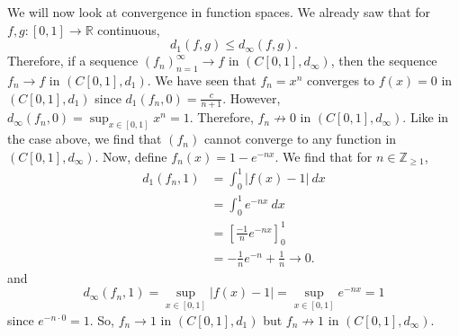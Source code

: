 \documentclass[a4paper, openany]{memoir}
\theoremstyle{definition}
\theoremstyle{plain}
\begin{document}
We will now look at convergence in function spaces. We already saw that for $f, g: [0, 1] \to \mathbb{R}$ continuous,
\[d_1(f, g) \leqslant d_\infty(f, g).\]
Therefore, if a sequence $(f_n)_{n=1}^{\infty} \to f$ in $(C[0, 1], d_\infty)$, then the sequence $f_n \to f$ in $(C[0, 1], d_1)$. We have seen that $f_n = x^n$ converges to $f(x) = 0$ in $(C[0, 1], d_1)$ since $d_1(f_n, 0) = \frac{c}{n+1}$. However, $d_\infty(f_n, 0) = \sup_{x \in [0, 1]} x^n = 1$. Therefore, $f_n \not\to 0$ in $(C[0, 1], d_\infty)$. Like in the case above, we find that $(f_n)$ cannot converge to any function in $(C[0, 1], d_\infty)$. Now, define $f_n(x) = 1 - e^{-nx}$. We find that for $n \in \mathbb{Z}_{\geqslant 1}$,
\begin{align*}
    d_1(f_n, 1) &= \int_0^1 |f(x) - 1| \ dx \\
    &= \int_0^1 e^{-nx} \ dx \\
    &= \left[\frac{-1}{n} e^{-nx}\right]_0^1 \\
    &= -\frac{1}{n} e^{-n} + \frac{1}{n} \to 0.
\end{align*}
and
\[d_\infty(f_n, 1) = \sup_{x \in [0, 1]} |f(x) - 1| = \sup_{x \in [0, 1]} e^{-nx} = 1\]
since $e^{-n \cdot 0} = 1$. So, $f_n \to 1$ in $(C[0, 1], d_1)$ but $f_n \not\to 1$ in $(C[0, 1], d_\infty)$.
\newpage
\end{document}
